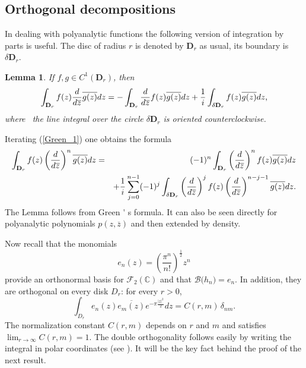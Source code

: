 \documentclass[12pt]{amsart}
\theoremstyle{plain}
\newtheorem{lemma}{Lemma}
\numberwithin{equation}{section}
\begin{document}
\subsection{Orthogonal decompositions}

In dealing with polyanalytic functions the following version of integration
by parts is useful. The disc of radius $r$ is denoted by $\mathbf{D}_{r}$ as
usual, its boundary is $\delta \mathbf{D}_{r}$.

\begin{lemma}
\label{intpart} If $f,g\in C^{1}(\mathbf{D}_{r})$, then 
\begin{equation}
\int_{\mathbf{D}_{r}}f(z)\frac{d}{d\overline{z}}\overline{g(z)}dz=-\int_{%
\mathbf{D}_{r}}\frac{d}{d\overline{z}}f(z)\overline{g(z)}dz+\frac{1}{i}%
\int_{\delta \mathbf{D}_{r}}f(z)\overline{g(z)}dz\text{,}  \label{Green_1}
\end{equation}%
where \ the line integral over the circle $\delta \mathbf{D}_{r}$ is
oriented counterclockwise.
\end{lemma}

Iterating (\ref{Green_1}) one obtains the formula 
\begin{eqnarray}
\int_{\mathbf{D}_{r}}f(z)\left( \frac{d}{d\overline{z}}\right) ^{n}\overline{%
g(z)}dz &=&(-1)^{n}\int_{\mathbf{D}_{r}}\left( \frac{d}{d\overline{z}}%
\right) ^{n}f(z)\overline{g(z)}dz  \notag \\
&&+\frac{1}{i}\sum_{j=0}^{n-1}(-1)^{j}\int_{\delta \mathbf{D}_{r}}\left( 
\frac{d}{d\overline{z}}\right) ^{j}f(z)\left( \frac{d}{d\overline{z}}\right)
^{n-j-1}\overline{g(z)}dz\text{.}  \label{Green_n}
\end{eqnarray}%
The Lemma follows from Green%
\'{}%
s formula. It can also be seen directly for polyanalytic polynomials $p(z,%
\overline{z})$ and then extended by density.

Now recall that the monomials 
\begin{equation*}
e_{n}(z)=\left( \frac{\pi ^{n}}{n!}\right) ^{\frac{1}{2}}z^{n}
\end{equation*}%
provide an orthonormal basis for $\mathcal{F}_{2}(%
\mathbb{C}
)$ and that $\mathcal{B(}h_{n})\mathcal{=}e_{n}$. In addition, they are
orthogonal on every disk $D_{r}$: for every $r>0$,%
\begin{equation}
\int_{D_{r}}e_{n}(z)\overline{e_{m}(z)}e^{-\pi \frac{\left\vert z\right\vert
^{2}}{2}}dz= C(r,m) \, \delta _{nm}\text{.}  \label{ortdisk}
\end{equation}%
The normalization constant $C(r,m)$ depends on $r$ and $m$ and satisfies $%
\lim _{r\to \infty } C(r,m) = 1$. The double orthogonality follows easily by
writing the integral in polar coordinates (see \cite[pg. 54]{Charly}). It
will be the key fact behind the proof of the next result.
\end{document}
